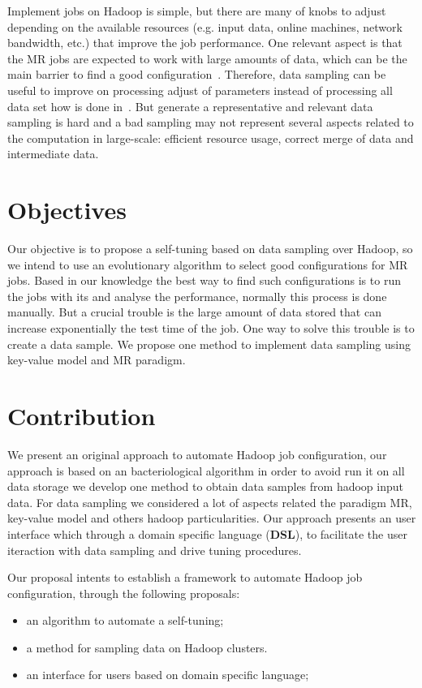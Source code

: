 Implement jobs on Hadoop is simple, but there are many of knobs to adjust depending
on the available resources (e.g. input data, online machines, network bandwidth, etc.)
that improve the job performance. One relevant aspect is that the MR jobs are expected
to work with large amounts of data, which can be the main barrier to find a good
configuration~\cite{Chen:2012}. Therefore, data sampling can be useful to improve
on processing adjust of parameters instead of processing all data set how is done
in~\cite{starfish}. But generate a representative and relevant data sampling is
hard and a bad sampling may not represent several aspects related to the computation
in large-scale: efficient resource usage, correct merge of data and intermediate data.

\section{Objectives}
Our objective is to propose a self-tuning based on data sampling over Hadoop, so
we intend to use an evolutionary algorithm \cite{baudry} to select good configurations
for MR jobs. Based in our knowledge the best way to find such configurations is
to run the jobs with its and analyse the performance, normally this process is
done manually. But a crucial trouble is the large amount of data stored that can
increase exponentially the test time of the job. One way to solve this trouble is
to create a data sample. We propose one method to implement data sampling using
key-value model and MR paradigm.

\section{Contribution}

We present an original approach to automate Hadoop job configuration, our
approach is based on an bacteriological algorithm \cite{baudry} in order to avoid
run it on all data storage we develop one method to obtain data samples from hadoop
input data. For data sampling we considered a lot of aspects related the paradigm MR,
key-value model and others hadoop particularities. Our approach presents an user
interface which through a domain specific language ({\bf DSL}), to facilitate the
user iteraction with data sampling and drive tuning procedures.

Our proposal intents to establish a framework to automate Hadoop job configuration,
through the following proposals:
\begin{itemize}
	\item an algorithm to automate a self-tuning;
	\item a method for sampling data on Hadoop clusters.
	\item an interface for users based on domain specific language;
\end{itemize}

